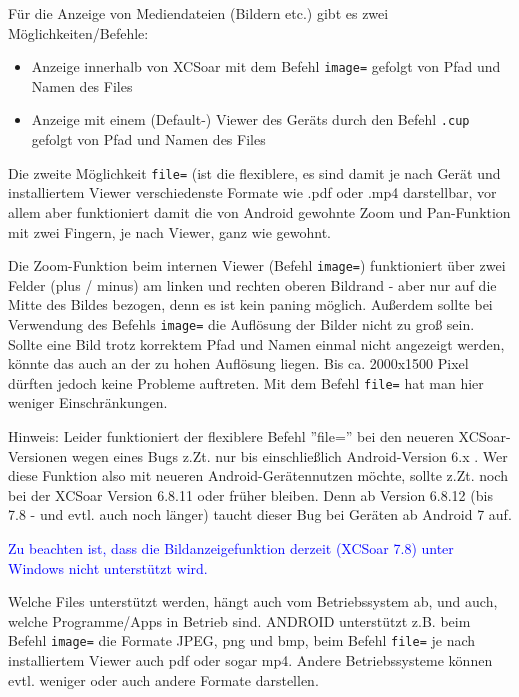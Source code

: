Für die Anzeige von Mediendateien (Bildern etc.) gibt es zwei Möglichkeiten/Befehle:

\begin{itemize}
\item Anzeige innerhalb von XCSoar mit dem Befehl \verb|image=| gefolgt von Pfad und Namen des Files
\item Anzeige mit einem (Default-) Viewer des Geräts durch den Befehl \verb|.cup| gefolgt von Pfad und Namen des Files
\end{itemize}



Die zweite Möglichkeit \verb|file=| (ist die flexiblere, es sind damit je nach Gerät und installiertem Viewer verschiedenste Formate wie .pdf oder .mp4 darstellbar, vor allem aber funktioniert damit die von Android gewohnte Zoom und Pan-Funktion mit zwei Fingern, je nach Viewer, ganz wie gewohnt. 

Die Zoom-Funktion beim internen Viewer (Befehl \verb|image=|) funktioniert über zwei Felder (plus / minus) am linken und rechten oberen Bildrand - aber nur auf die Mitte des Bildes bezogen, denn es ist kein paning möglich. Außerdem sollte bei Verwendung des Befehls \verb|image=| die Auflösung der Bilder nicht zu groß sein. 
Sollte eine Bild trotz korrektem Pfad und Namen einmal nicht angezeigt werden, könnte das auch an der zu hohen Auflösung liegen. Bis ca. 2000x1500 Pixel dürften jedoch keine Probleme auftreten. Mit dem Befehl \verb|file=| hat man hier weniger Einschränkungen. 

%
Hinweis: 
Leider funktioniert der flexiblere Befehl ''file='' bei den neueren XCSoar-Versionen wegen eines Bugs z.Zt. nur bis einschließlich Android-Version 6.x . Wer diese Funktion also mit neueren Android-Gerätennutzen möchte, sollte z.Zt. noch bei der XCSoar Version 6.8.11 oder früher bleiben. Denn ab Version 6.8.12 (bis 7.8 - und evtl. auch noch länger) taucht dieser Bug bei Geräten ab Android 7 auf.
% 
% 

\textcolor{blue}{Zu beachten ist, dass die Bildanzeigefunktion derzeit (XCSoar 7.8) unter Windows nicht unterstützt wird.} 


Welche Files unterstützt werden, hängt auch vom Betriebssystem ab, und auch, welche Programme/Apps
in Betrieb sind. ANDROID unterstützt z.B. beim Befehl \verb|image=| die Formate JPEG, png und bmp, beim Befehl \verb|file=| je nach installiertem Viewer auch pdf oder sogar mp4.
Andere Betriebssysteme können evtl. weniger oder auch andere Formate darstellen.

